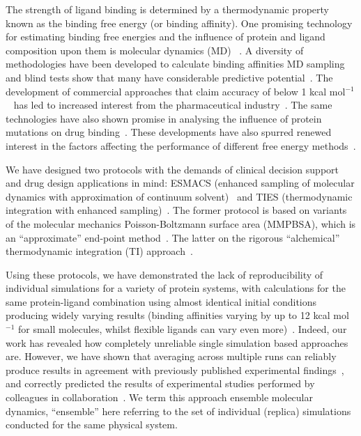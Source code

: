 The strength of ligand binding is determined by a thermodynamic property known
as the binding free energy (or binding affinity). 
One promising technology for
estimating binding free energies and the influence of protein and ligand
composition upon them is molecular dynamics (MD) ~\cite{Karplus2005}. 
A diversity of methodologies have been developed to calculate binding affinities
MD sampling~\cite{Mobley2012} and blind tests show that many have considerable
predictive potential~\cite{Mey2017, Yin2017}.
The development of commercial approaches that claim accuracy of below 1 
kcal mol$^{-1}$~\cite{Wang2015} has led to increased interest from the 
pharmaceutical industry~\cite{Ganesan2017}.
The same technologies have also shown promise in analysing the influence of 
protein mutations on drug binding~\cite{Mondal2016, Bunney2015}.
These developments have also spurred renewed interest in the factors affecting 
the performance of different free energy methods~\cite{Aldeghi2017, Cappel2016}.

We have designed two protocols
with the demands of clinical decision support and drug design applications in
mind: ESMACS (enhanced sampling of molecular dynamics with approximation of
continuum solvent)~\cite{Wan2017brd4} and TIES (thermodynamic integration with
enhanced sampling)~\cite{Bhati2017}. 
The former protocol is based on variants
of the molecular mechanics Poisson-Boltzmann surface area (MMPBSA), which is
an ``approximate'' end-point method~\cite{Massova1999}. 
The latter on the rigorous ``alchemical'' thermodynamic integration (TI)
approach~\cite{Straatsma1988}. 

Using these protocols, we have demonstrated the lack of reproducibility of
individual simulations for a variety of protein systems, with calculations for
the same protein-ligand combination using almost identical initial conditions
producing widely varying results (binding affinities varying by up to 12 kcal
mol $^{-1}$ for small molecules, whilst flexible ligands can vary even
more)~\cite{Wan2015, Sadiq2010, Wright2014}. Indeed, our work has revealed how
completely unreliable single simulation based approaches are. However, we have
shown that averaging across multiple runs can reliably produce results in
agreement with previously published experimental findings~\cite{Sadiq2010,
Wan2011, Wright2014, Bhati2017, Wan2017brd4, Wan2017trk}, and correctly
predicted the results of experimental studies performed by colleagues in
collaboration~\cite{Bunney2015}. We term this approach ensemble molecular
dynamics, ``ensemble'' here referring to the set of individual (replica)
simulations conducted for the same physical system. 

